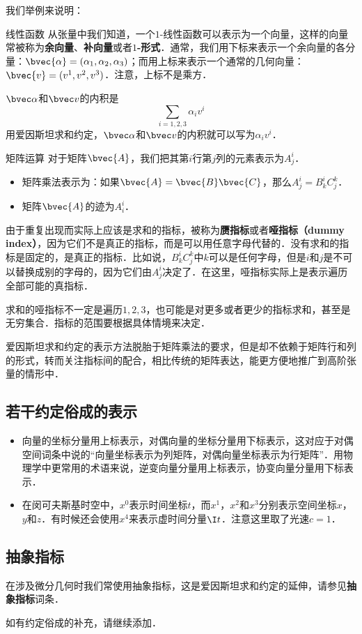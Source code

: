 我们举例来说明：

\begin{example}{线性函数}
从张量中我们知道，一个$1$-线性函数可以表示为一个向量，这样的向量常被称为\textbf{余向量}、\textbf{补向量}或者\textbf{$1$-形式}．通常，我们用下标来表示一个余向量的各分量：$\bvec{\alpha}=(\alpha_1, \alpha_2, \alpha_3)$；而用上标来表示一个通常的几何向量：$\bvec{v}=(v^1, v^2, v^3)$．注意，上标不是乘方．

$\bvec\alpha$和$\bvec v$的内积是$$\sum\limits_{i=1, 2, 3}\alpha_i v^i$$
用爱因斯坦求和约定，$\bvec\alpha$和$\bvec v$的内积就可以写为$\alpha_i v^i$．
\end{example}

\begin{example}{矩阵运算}
对于矩阵$\bvec{A}$，我们把其第$i$行第$j$列的元素表示为$A^i_j$．
\begin{itemize}
\item 矩阵乘法表示为：如果$\bvec{A}=\bvec{B}\bvec{C}$，那么$A^i_j=B^i_k C^k_j$．
\item 矩阵$\bvec{A}$的迹为$A^i_i$．

\end{itemize}
\end{example}

由于重复出现而实际上应该是求和的指标，被称为\textbf{赝指标}或者\textbf{哑指标（dummy index）}，因为它们不是真正的指标，而是可以用任意字母代替的．没有求和的指标是固定的，是真正的指标．比如说，$B^i_k C^k_j$中$k$可以是任何字母，但是$i$和$j$是不可以替换成别的字母的，因为它们由$A^i_j$决定了．在这里，哑指标实际上是表示遍历全部可能的真指标．

求和的哑指标不一定是遍历$1, 2, 3$，也可能是对更多或者更少的指标求和，甚至是无穷集合．指标的范围要根据具体情境来决定．

爱因斯坦求和约定的表示方法脱胎于矩阵乘法的要求，但是却不依赖于矩阵行和列的形式，转而关注指标间的配合，相比传统的矩阵表达，能更方便地推广到高阶张量的情形中．


\subsection{若干约定俗成的表示}
\begin{itemize}
\item 向量的坐标分量用上标表示，对偶向量的坐标分量用下标表示，这对应于对偶空间词条中说的“向量坐标表示为列矩阵，对偶向量坐标表示为行矩阵”．用物理学中更常用的术语来说，逆变向量分量用上标表示，协变向量分量用下标表示．

\item 在闵可夫斯基时空中，$x^0$表示时间坐标$t$，而$x^1$，$x^2$和$x^3$分别表示空间坐标$x$，$y$和$z$．有时候还会使用$x^4$来表示虚时间分量$\I t$．注意这里取了光速$c=1$．




\end{itemize}







\subsection{抽象指标}

在涉及微分几何时我们常使用抽象指标，这是爱因斯坦求和约定的延伸，请参见\textbf{抽象指标}词条．



\begin{issues}
如有约定俗成的补充，请继续添加．
\end{issues}


